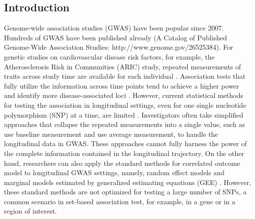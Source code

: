 \documentclass[12pt]{article}
\begin{document}
\subsection*{Introduction}
Genome-wide association studies (GWAS) have been popular since 2007. Hundreds of GWAS have been published already (A Catalog of Published Genome-Wide Association Studies: http://www.genome.gov/26525384). For genetic studies on cardiovascular disease risk factors, for example, the Atherosclerosis Risk in Communities (ARIC) study, repeated measurements of traits across study time are available for each individual \cite{Heiss1989}. Association tests that fully utilize the information across time points tend to achieve a higher power and identify more disease-associated loci \cite{Furlotte2012,Xu2014}. However, current statistical methods for testing the association in longitudinal settings, even for one single nucleotide polymorphism (SNP) at a time, are limited \cite{Fan2012,Furlotte2012}. Investigators often take simplified approaches that collapse the repeated measurements into a single value, such as use baseline measurement and use average measurement, to handle the longitudinal data in GWAS. These approaches cannot fully harness the power of the complete information contained in the longitudinal trajectory. On the other hand, researchers can also apply the standard methods for correlated outcome model to longitudinal GWAS settings, namely, random effect models \cite{laird1982random} and marginal models estimated by generalized estimating equations (GEE) \cite{liang1986longitudinal,zeger1988models}. However, these standard methods are not optimized for testing a large number of SNPs, a common scenario in set-based association test, for example, in a gene or in a region of interest.
\end{document}
